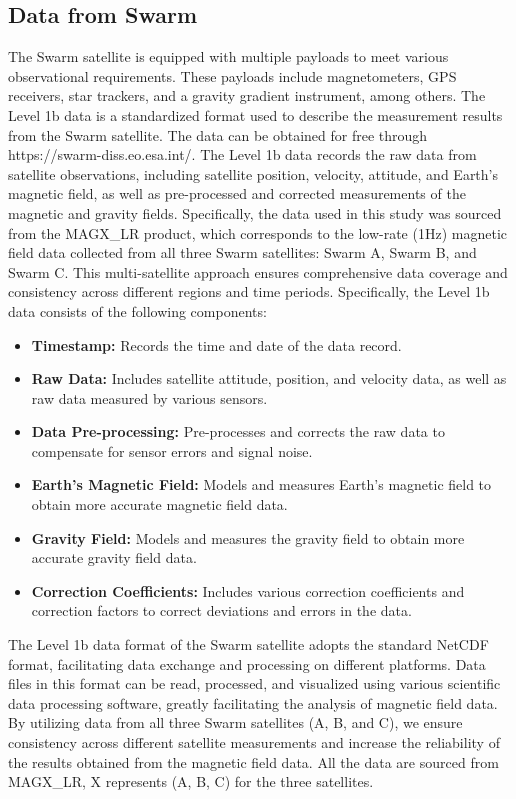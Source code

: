 \documentclass[3p,authoryear,preprint,12pt]{elsarticle}
\begin{document}
\subsection{Data from Swarm}
The Swarm satellite is equipped with multiple payloads to meet various observational requirements. These payloads include magnetometers, GPS receivers, star trackers, and a gravity gradient instrument, among others. {The Level 1b data is a standardized format used to describe the measurement results from the Swarm satellite. The data can be obtained for free through https://swarm-diss.eo.esa.int/. The Level 1b data records the raw data from satellite observations, including satellite position, velocity, attitude, and Earth's magnetic field, as well as pre-processed and corrected measurements of the magnetic and gravity fields. Specifically, the data used in this study was sourced from the MAGX\_LR product, which corresponds to the low-rate (1Hz) magnetic field data collected from all three Swarm satellites: Swarm A, Swarm B, and Swarm C. This multi-satellite approach ensures comprehensive data coverage and consistency across different regions and time periods.
} Specifically, the Level 1b data consists of the following components:
\begin{itemize}
	\item \textbf{Timestamp:} Records the time and date of the data record.
	\item \textbf{Raw Data:} Includes satellite attitude, position, and velocity data, as well as raw data measured by various sensors.
	\item \textbf{Data Pre-processing:}	Pre-processes and corrects the raw data to compensate for sensor errors and signal noise.
	\item \textbf{Earth's Magnetic Field:} Models and measures Earth's magnetic field to obtain more accurate magnetic field data.
	\item \textbf{Gravity Field:} Models and measures the gravity field to obtain more accurate gravity field data.
	\item \textbf{Correction Coefficients:} Includes various correction coefficients and correction factors to correct deviations and errors in the data.	
\end{itemize}

{The Level 1b data format of the Swarm satellite adopts the standard NetCDF format, facilitating data exchange and processing on different platforms. Data files in this format can be read, processed, and visualized using various scientific data processing software, greatly facilitating the analysis of magnetic field data. By utilizing data from all three Swarm satellites (A, B, and C), we ensure consistency across different satellite measurements and increase the reliability of the results obtained from the magnetic field data.
} {All the data are sourced from MAGX\_LR, X represents (A, B, C) for the three satellites.} 
\end{document}
